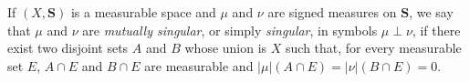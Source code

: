 If $(X, \mathbf{S})$ is a measurable space and $\mu$ and $\nu$ are signed measures on $\mathbf{S}$, we say that $\mu$ and $\nu$ are \textit{mutually singular}, or simply \textit{singular}, in symbols $\mu \perp \nu$, if there exist two disjoint sets $A$ and $B$ whose union is $X$ such that, for every measurable set $E$, $A \cap E$ and $B \cap E$ are measurable and $|\mu|(A \cap E) = |\nu|(B \cap E) = 0$.
